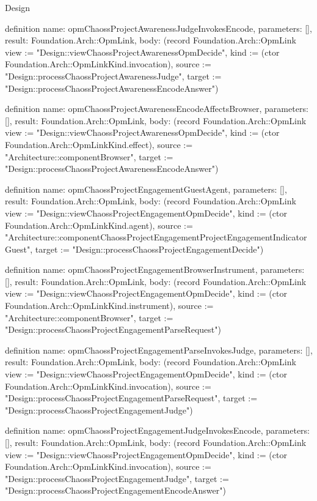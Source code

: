 \begin{lexlean}{Design}
\begin{semanticmodule}
definition{
  name: opmChaossProjectAwarenessJudgeInvokesEncode,
  parameters: [],
  result: Foundation.Arch::OpmLink,
  body: (record Foundation.Arch::OpmLink {view := "Design::viewChaossProjectAwarenessOpmDecide", kind := (ctor Foundation.Arch::OpmLinkKind.invocation), source := "Design::processChaossProjectAwarenessJudge", target := "Design::processChaossProjectAwarenessEncodeAnswer"})
}

definition{
  name: opmChaossProjectAwarenessEncodeAffectsBrowser,
  parameters: [],
  result: Foundation.Arch::OpmLink,
  body: (record Foundation.Arch::OpmLink {view := "Design::viewChaossProjectAwarenessOpmDecide", kind := (ctor Foundation.Arch::OpmLinkKind.effect), source := "Architecture::componentBrowser", target := "Design::processChaossProjectAwarenessEncodeAnswer"})
}

definition{
  name: opmChaossProjectEngagementGuestAgent,
  parameters: [],
  result: Foundation.Arch::OpmLink,
  body: (record Foundation.Arch::OpmLink {view := "Design::viewChaossProjectEngagementOpmDecide", kind := (ctor Foundation.Arch::OpmLinkKind.agent), source := "Architecture::componentChaossProjectEngagementProjectEngagementIndicatorGuest", target := "Design::processChaossProjectEngagementDecide"})
}

definition{
  name: opmChaossProjectEngagementBrowserInstrument,
  parameters: [],
  result: Foundation.Arch::OpmLink,
  body: (record Foundation.Arch::OpmLink {view := "Design::viewChaossProjectEngagementOpmDecide", kind := (ctor Foundation.Arch::OpmLinkKind.instrument), source := "Architecture::componentBrowser", target := "Design::processChaossProjectEngagementParseRequest"})
}

definition{
  name: opmChaossProjectEngagementParseInvokesJudge,
  parameters: [],
  result: Foundation.Arch::OpmLink,
  body: (record Foundation.Arch::OpmLink {view := "Design::viewChaossProjectEngagementOpmDecide", kind := (ctor Foundation.Arch::OpmLinkKind.invocation), source := "Design::processChaossProjectEngagementParseRequest", target := "Design::processChaossProjectEngagementJudge"})
}

definition{
  name: opmChaossProjectEngagementJudgeInvokesEncode,
  parameters: [],
  result: Foundation.Arch::OpmLink,
  body: (record Foundation.Arch::OpmLink {view := "Design::viewChaossProjectEngagementOpmDecide", kind := (ctor Foundation.Arch::OpmLinkKind.invocation), source := "Design::processChaossProjectEngagementJudge", target := "Design::processChaossProjectEngagementEncodeAnswer"})
}


\end{semanticmodule}
\end{lexlean}
